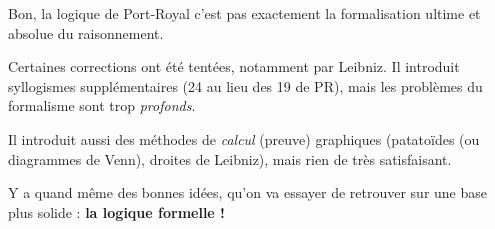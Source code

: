  \begin{frame}
 
 Bon, la logique de Port-Royal c'est pas exactement la formalisation ultime et absolue du raisonnement. \newline \pause
 
Certaines corrections ont été tentées, notamment par Leibniz. \pause Il introduit syllogismes supplémentaires (24 au lieu des 19 de PR), mais les problèmes du formalisme sont trop \textit{profonds}. \pause  \newline

Il introduit aussi des méthodes de \textit{calcul} (preuve) graphiques (patatoïdes (ou diagrammes de Venn), droites de Leibniz), mais rien de très satisfaisant.\pause \newline

Y a quand même des bonnes idées, qu'on va essayer de retrouver sur une base plus solide \pause : \textbf{la logique formelle !}
 
 \end{frame}
 
 
 
 
 
